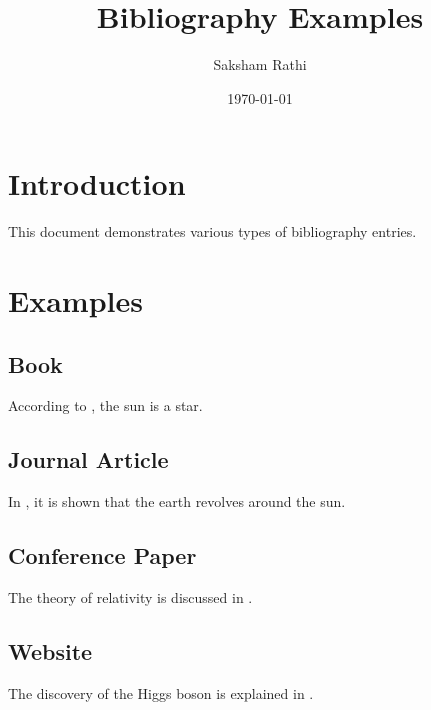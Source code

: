 \documentclass{article}
\begin{document}
\title{Bibliography Examples}
\author{Saksham Rathi}
\date{\today}
\maketitle

\section{Introduction}
This document demonstrates various types of bibliography entries.
\section{Examples}
\subsection{Book}
According to \cite{book_example}, the sun is a star.

\subsection{Journal Article}
In \cite{article_example}, it is shown that the earth revolves around the sun.

\subsection{Conference Paper}
The theory of relativity is discussed in \cite{conference_example}.

\subsection{Website}
The discovery of the Higgs boson is explained in \cite{website_example}.

\end{document}
